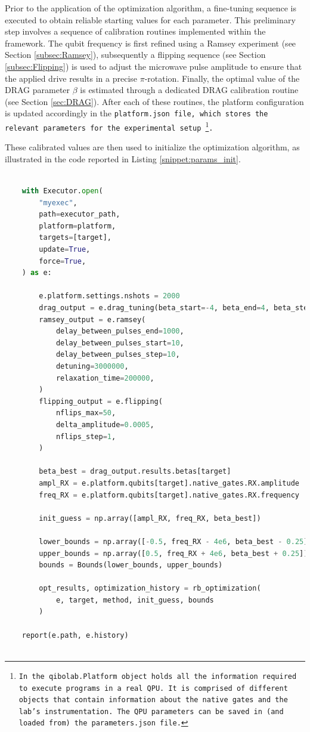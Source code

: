 Prior to the application of the optimization algorithm, a fine-tuning sequence is executed to obtain reliable starting values for each parameter. 
This preliminary step involves a sequence of calibration routines implemented within the \Qibocal framework.
The qubit frequency is first refined using a Ramsey experiment (see Section \ref{subsec:Ramsey}), subsequently a flipping sequence (see Section \ref{subsec:Flipping}) is used to adjust the microwave pulse amplitude to ensure that the applied drive results in a precise $\pi$-rotation.
Finally, the optimal value of the DRAG parameter $\beta$ is estimated through a dedicated DRAG calibration routine (see Section \ref{sec:DRAG}).
After each of these routines, the platform configuration is updated accordingly in the \tt{platform.json} file, which stores the relevant parameters for the experimental setup 
\footnote{In \Qibolab the \tt{qibolab.Platform} object holds all the information required to execute programs in a real QPU. It is comprised of different objects that contain information about the native gates and the lab's instrumentation. The QPU parameters can be saved in (and loaded from) the \tt{parameters.json} file.}.

These calibrated values are then used to initialize the optimization algorithm, as illustrated in the code reported in Listing \ref{snippet:params_init}.

\begin{lstlisting}[language=Python, caption={Code to set up the RX gate optimization experiment.}, label={snippet:params_init}]
    
    with Executor.open(
        "myexec",
        path=executor_path,
        platform=platform,
        targets=[target],
        update=True,
        force=True,
    ) as e:
    
        e.platform.settings.nshots = 2000
        drag_output = e.drag_tuning(beta_start=-4, beta_end=4, beta_step=0.5)
        ramsey_output = e.ramsey(
            delay_between_pulses_end=1000,
            delay_between_pulses_start=10,
            delay_between_pulses_step=10,
            detuning=3000000,
            relaxation_time=200000,
        )
        flipping_output = e.flipping(
            nflips_max=50,
            delta_amplitude=0.0005,  
            nflips_step=1,
        )
    
        beta_best = drag_output.results.betas[target]
        ampl_RX = e.platform.qubits[target].native_gates.RX.amplitude
        freq_RX = e.platform.qubits[target].native_gates.RX.frequency
    
        init_guess = np.array([ampl_RX, freq_RX, beta_best])
    
        lower_bounds = np.array([-0.5, freq_RX - 4e6, beta_best - 0.25])
        upper_bounds = np.array([0.5, freq_RX + 4e6, beta_best + 0.25])
        bounds = Bounds(lower_bounds, upper_bounds)
    
        opt_results, optimization_history = rb_optimization(
            e, target, method, init_guess, bounds
        )
    
    report(e.path, e.history)
    
\end{lstlisting}


